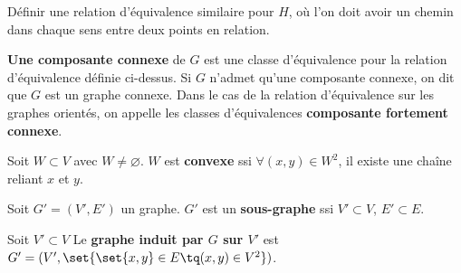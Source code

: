 \documentclass{scrartcl}
\begin{document}
			\exo Définir une relation d'équivalence similaire pour $H$, où l'on doit avoir un chemin dans chaque sens entre deux points en relation.

			 \textbf{Une composante connexe} de $G$ est une classe d'équivalence pour la relation d'équivalence définie ci-dessus.
			Si $G$ n'admet qu'une composante connexe, on dit que $G$ est un graphe connexe. 
			Dans le cas de la relation d'équivalence sur les graphes orientés, on appelle les classes d'équivalences \textbf{composante fortement connexe}.

			 Soit $W \subset V$ avec $W \neq \varnothing$. 
			$W$ est \textbf{convexe} ssi $\forall(x,y) \in W^2$, il existe une chaîne reliant $x$ et $y$.


			 Soit $G' = (V',E')$ un graphe.
			$G'$ est un \textbf{sous-graphe} ssi $V' \subset V$, $E' \subset E$.

			 Soit $V' \subset V$
			Le \textbf{graphe induit par $G$ sur $V'$} est $G' = (V', \set{\set{x,y}\in E \tq (x,y) \in V^2})$.
\end{document}
